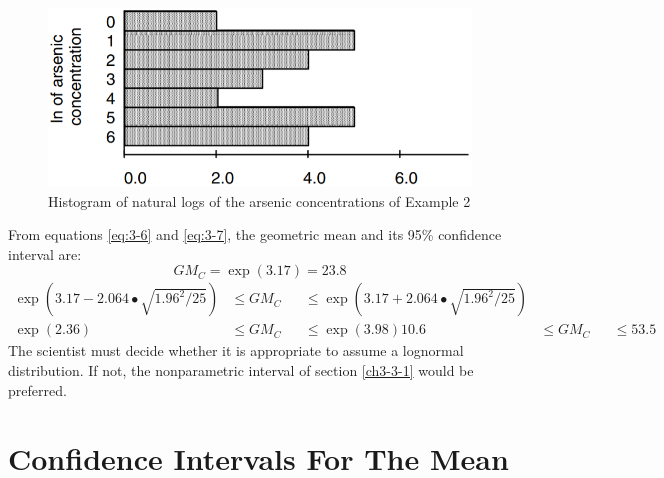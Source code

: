 \documentclass[]{book}
\begin{document}
\begin{figure}

{\centering \includegraphics[width=11.22in]{figures/3_6} 

}

\caption{Histogram of natural logs of the arsenic concentrations of Example 2}\label{fig:fig-3-6}
\end{figure}

From equations \eqref{eq:3-6} and \eqref{eq:3-7}, the geometric mean and its 95\% confidence interval are: \[GM_{C} = \exp{(3.17)} = 23.8\]
\begin{equation}
\begin{aligned}
\exp{\left( 3.17 - 2.064 \bullet \sqrt{1.96^{2} / 25} \right)} &\leq GM_{C} &&\leq \exp{\left( 3.17 + 2.064 \bullet \sqrt{1.96^{2} / 25} \right)} \\
\exp{(2.36)} &\leq GM_{C} &&\leq \exp{(3.98)}
10.6 &\leq GM_{C} &&\leq 53.5
\end{aligned}
\end{equation}
The scientist must decide whether it is appropriate to assume a lognormal distribution. If not, the nonparametric interval of section \ref{ch3-3-1} would be preferred.

\hypertarget{ch3-4}{%
\section{Confidence Intervals For The Mean}\label{ch3-4}}
\end{document}
